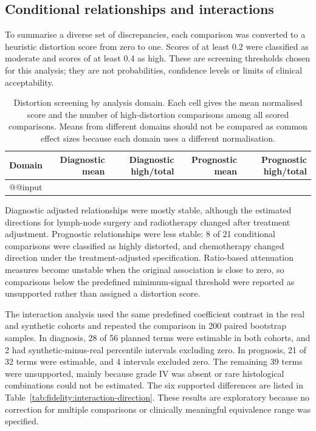 \subsection{Conditional relationships and interactions}

To summarise a diverse set of discrepancies, each comparison was converted to a
heuristic distortion score from zero to one.  Scores of at least 0.2 were
classified as moderate and scores of at least 0.4 as high.  These are screening
thresholds chosen for this analysis; they are not probabilities, confidence
levels or limits of clinical acceptability.

\begin{table}[htbp]
\centering\small
\caption{Distortion screening by analysis domain.  Each cell gives the mean
normalised score and the number of high-distortion comparisons among all scored
comparisons.  Means from different domains should not be compared as common
effect sizes because each domain uses a different normalisation.}
\label{tab:fidelity:domains}
\begin{tabularx}{\linewidth}{@{}Yrrrr@{}}
\toprule
Domain & Diagnostic mean & Diagnostic high/total & Prognostic mean &
Prognostic high/total \\
\midrule
\csname @@input
\bottomrule
\end{tabularx}
\end{table}

Diagnostic adjusted relationships were mostly stable, although the estimated
directions for lymph-node surgery and radiotherapy changed after treatment
adjustment.  Prognostic relationships were less stable: 8 of 21 conditional
comparisons were classified as highly distorted, and chemotherapy changed
direction under the treatment-adjusted specification.  Ratio-based attenuation
measures become unstable when the original association is close to zero, so
comparisons below the predefined minimum-signal threshold were reported as
unsupported rather than assigned a distortion score.

The interaction analysis used the same predefined coefficient contrast in the
real and synthetic cohorts and repeated the comparison in 200 paired bootstrap
samples. In diagnosis, 28 of 56 planned terms were estimable in both cohorts,
and 2 had synthetic-minus-real percentile intervals excluding zero. In
prognosis, 21 of 32 terms were estimable, and 4 intervals excluded zero. The
remaining 39 terms were unsupported, mainly because grade IV was absent or rare
histological combinations could not be estimated. The six supported
differences are listed in
Table~\ref{tab:fidelity:interaction-direction}. These results are exploratory
because no correction for multiple comparisons or clinically meaningful
equivalence range was specified.

